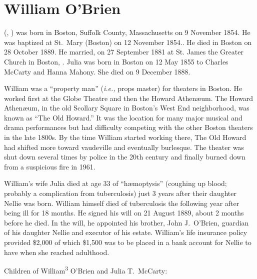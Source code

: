 \section{William O'Brien}

 (, ) was born in Boston, Suffolk County, Massachusetts on 9 November 1854.\cite{William3OBrienBirth} He was baptized at St.\ Mary (Boston) on 12 November 1854.\cite{William3OBrienBaptism}. He died in Boston on 28 October 1889.\cite{William3OBrienDeath} He married, on 27 September 1881 at St. James the Greater Church in Boston, .\cite{William3OBrienMarriage} Julia was born in Boston on 12 May 1855 to Charles McCarty and Hanna Mahony.\cite{JuliaMcCartyBaptism} She died on 9 December 1888.\cite{JuliaMcCartyDeath}

William was a ``property man'' (\textit{i.e.,} props master\cite{PropertyMan}) for theaters in Boston. He worked first at the Globe Theatre\cite{WilliamOBrien1880} and then the Howard Athen\ae um.\cite{WilliamOBrien1883} The Howard Athen\ae um, in the old Scollary Square in Boston's West End neighborhood, was known as ``The Old Howard.'' It was the location for many major musical and drama performances but had difficulty competing with the other Boston theaters in the late 1800s. By the time William started working there, The Old Howard had shifted more toward vaudeville and eventually burlesque. The theater was shut down several times by police in the 20th century and finally burned down from a suspicious fire in 1961.\cite{HowardAthenaeum}

William's wife Julia died at age 33 of ``h\ae moptysis'' (coughing up blood; probably a complication from tuberculosis) just 3 years after their daughter Nellie was born.\cite{JuliaMcCartyDeath} William himself died of tuberculosis the following year after being ill for 18 months.\cite{William3OBrienDeath} He signed his will on 21 August 1889, about 2 months before he died. In the will, he appointed his brother, John J.\ O'Brien, guardian of his daughter Nellie and executor of his estate. William's life insurance policy provided \$2,000 of which \$1,500 was to be placed in a bank account for Nellie to have when she reached adulthood.\cite{WilliamOBrienWill}

\begin{KidsIntro}
	Children of William\textsuperscript{3} O'Brien and Julia T.\ McCarty:
\end{KidsIntro}

